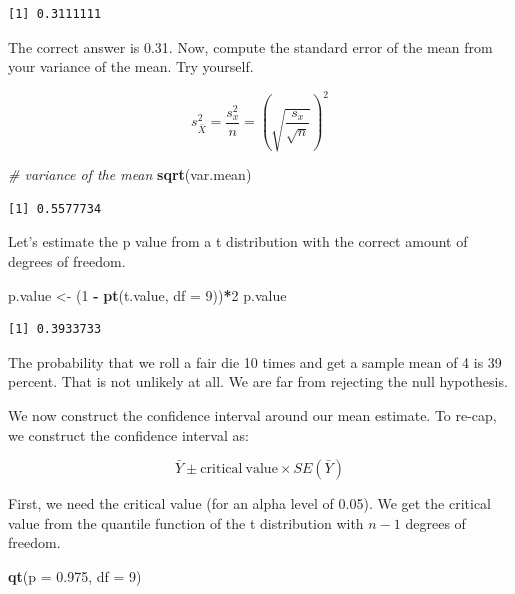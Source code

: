 \documentclass[]{article}
\newenvironment{Shaded}{\begin{snugshade}}{\end{snugshade}}
\newcommand{\KeywordTok}[1]{\textcolor[rgb]{0.13,0.29,0.53}{\textbf{#1}}}
\newcommand{\DataTypeTok}[1]{\textcolor[rgb]{0.13,0.29,0.53}{#1}}
\newcommand{\DecValTok}[1]{\textcolor[rgb]{0.00,0.00,0.81}{#1}}
\newcommand{\FloatTok}[1]{\textcolor[rgb]{0.00,0.00,0.81}{#1}}
\newcommand{\StringTok}[1]{\textcolor[rgb]{0.31,0.60,0.02}{#1}}
\newcommand{\CommentTok}[1]{\textcolor[rgb]{0.56,0.35,0.01}{\textit{#1}}}
\newcommand{\OperatorTok}[1]{\textcolor[rgb]{0.81,0.36,0.00}{\textbf{#1}}}
\newcommand{\NormalTok}[1]{#1}
\theoremstyle{definition}
\theoremstyle{definition}
\theoremstyle{definition}
\theoremstyle{remark}
\begin{document}
\begin{verbatim}
[1] 0.3111111
\end{verbatim}

The correct answer is 0.31. Now, compute the standard error of the mean
from your variance of the mean. Try yourself.

\[ s^2_{\bar{X}} = \frac{s_{x}^2}{n} = (\sqrt{ \frac{s_{x}}{\sqrt{n}}})^2 \]

\begin{Shaded}
\begin{Highlighting}[]
\CommentTok{# variance of the mean}
\KeywordTok{sqrt}\NormalTok{(var.mean)}
\end{Highlighting}
\end{Shaded}

\begin{verbatim}
[1] 0.5577734
\end{verbatim}

Let's estimate the p value from a t distribution with the correct amount
of degrees of freedom.

\begin{Shaded}
\begin{Highlighting}[]
\NormalTok{p.value <-}\StringTok{ }\NormalTok{(}\DecValTok{1} \OperatorTok{-}\StringTok{ }\KeywordTok{pt}\NormalTok{(t.value, }\DataTypeTok{df =} \DecValTok{9}\NormalTok{))}\OperatorTok{*}\DecValTok{2}
\NormalTok{p.value}
\end{Highlighting}
\end{Shaded}

\begin{verbatim}
[1] 0.3933733
\end{verbatim}

The probability that we roll a fair die 10 times and get a sample mean
of 4 is 39 percent. That is not unlikely at all. We are far from
rejecting the null hypothesis.

We now construct the confidence interval around our mean estimate. To
re-cap, we construct the confidence interval as:

\[ \bar{Y} \pm \mathrm{critical \: value} \times  SE(\bar{Y})  \]

First, we need the critical value (for an alpha level of 0.05). We get
the critical value from the quantile function of the t distribution with
\(n-1\) degrees of freedom.

\begin{Shaded}
\begin{Highlighting}[]
\KeywordTok{qt}\NormalTok{(}\DataTypeTok{p =} \FloatTok{0.975}\NormalTok{, }\DataTypeTok{df =} \DecValTok{9}\NormalTok{)}
\end{Highlighting}
\end{Shaded}
\end{document}
